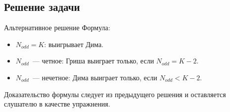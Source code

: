 \subsection{Решение задачи}

\begin{frame}[t]{Альтернативное решение}
 Формула:
 \begin{itemize}
     \item $N_{odd} = K$: выигрывает Дима.
     \item $N_{odd}$~--- четное: Гриша выиграет только, если $N_{odd} = K - 2$.
     \item $N_{odd}$~--- нечетное: Дима выиграет только, если $N_{odd} < K - 2$.
 \end{itemize}
 Доказательство формулы следует из предыдущего решения и оставляется слушателю в качестве упражнения.
\end{frame}